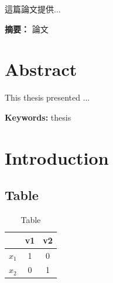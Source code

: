 \documentclass[12pt,a4paper,oneside]{book}
\providecommand{\keywordsch}[1]
{
  \small	
  \textbf{摘要： }#1
}
\providecommand{\keywords}[1]
{
  \small	
  \textbf{Keywords: }#1
}
\begin{document}
這篇論文提供...

\mbox{}
\vfill
\keywordsch{論文}%

\thispagestyle{empty}

\chapter*{\centering Abstract}

This thesis presented ...

\mbox{}
\vfill
\keywords{thesis}%

\thispagestyle{empty}

\newpage
\setcounter{page}{1}
{
  \hypersetup{linkcolor=black}
  \tableofcontents
}

\newpage

\chapter{Introduction}
\label{ch: intro}
\section{Table}

\begin{table}[H]
\centering
\fontsize{20}{20}\selectfont%
\caption{Table}
\renewcommand{\arraystretch}{1.5}
\label{tab: tab1}
\begin{tabular}[t]{|c|c|c|}%
    \hline
    & v1 & v2 \\
    \hline
    $x_1$ & 1 & 0\\
    \hline
    $x_2$ & 0 & 1\\
    \hline
\end{tabular}
\end{table}
\end{document}
